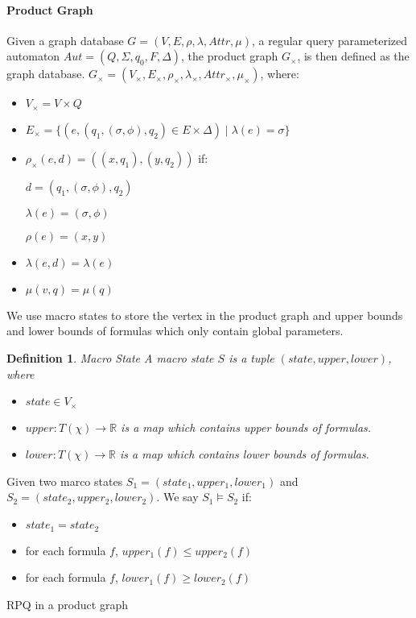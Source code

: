 \documentclass{article}
\newtheorem{definition}{Definition}
\begin{document}
\paragraph{Product Graph} Given a graph database $G = (V, E, \rho, \lambda, Attr, \mu)$, a regular query parameterized automaton $Aut = (Q, \Sigma, q_0, F, \Delta)$, the product graph $G_{\times}$, is then defined as the graph database.
$G_{\times} = (V_{\times}, E_{\times}, \rho_{\times}, \lambda_{\times}, Attr_{\times}, \mu_{\times})$, where:
\begin{itemize}
    \item $V_{\times} =  V \times Q$
    \item $E_{\times} = \{(e, (q_1, (\sigma, \phi), q_2) \in E \times \Delta) \mid \lambda(e) = \sigma\}$
    \item $\rho_{\times}(e, d) = ((x, q_1), (y, q_2))$ if:

                  \quad  $d = (q_1, (\sigma, \phi), q_2)$

                   \quad $\lambda(e) = (\sigma, \phi)$ 

                   \quad $\rho(e) = (x, y)$
    \item $\lambda(e,d) = \lambda(e)$
    \item $\mu(v, q) = \mu(q)$
\end{itemize} 

We use macro states to store the vertex in the product graph and upper bounds and lower bounds of 
formulas which only contain global parameters.
\begin{definition}{Macro State}
    A macro state $S$ is a tuple $(state, upper, lower)$, where 
    \begin{itemize}
        \item $state \in V_{\times}$ 
        \item $upper: T(\chi) \to \mathbb{R}$ is a map which contains upper bounds of formulas.  
        \item $lower: T(\chi) \to \mathbb{R}$ is a map which contains lower bounds of formulas.
    \end{itemize}
\end{definition} 

Given two marco states $S_1 = (state_1, upper_1, lower_1)$ and $S_2 = (state_2, upper_2, lower_2)$. 
We say $S_1 \models S_2$ if:  
\begin{itemize}
    \item $state_1 = state_2$ 
    \item for each formula $f$, $upper_1(f) \le upper_2(f)$
    \item for each formula $f$, $lower_1(f) \ge lower_2(f)$
\end{itemize}



\begin{algorithm}
\caption{RPQ in a product graph}
\begin{algorithmic}
    
\end{algorithmic}
\end{algorithm}
\end{document}
